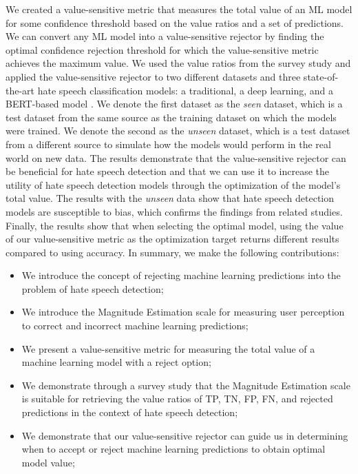 %
We created a value-sensitive metric that measures the total value of an ML model for some confidence threshold based on the value ratios and a set of predictions.
%
We can convert any ML model into a value-sensitive rejector by finding the optimal confidence rejection threshold for which the value-sensitive metric achieves the maximum value.
%
We used the value ratios from the survey study and applied the value-sensitive rejector to two different datasets and three state-of-the-art hate speech classification models: a traditional, a deep learning, and a BERT-based model \citep{devlin2018bert}.
%
We denote the first dataset as the \emph{seen} dataset, which is a test dataset from the same source as the training dataset on which the models were trained.
%
We denote the second as the \emph{unseen} dataset, which is a test dataset from a different source to simulate how the models would perform in the real world on new data.
%
The results demonstrate that the value-sensitive rejector can be beneficial for hate speech detection and that we can use it to increase the utility of hate speech detection models through the optimization of the model's total value.
%
The results with the \emph{unseen} data show that hate speech detection models are susceptible to bias, which confirms the findings from related studies.
%
Finally, the results show that when selecting the optimal model, using the value of our value-sensitive metric as the optimization target returns different results compared to using accuracy.
%
In summary, we make the following contributions:
%
\begin{itemize}
	\item We introduce the concept of rejecting machine learning predictions into the problem of hate speech detection;
	\item We introduce the Magnitude Estimation scale for measuring user perception to correct and incorrect machine learning predictions;
	\item We present a value-sensitive metric for measuring the total value of a machine learning model with a reject option;
	\item We demonstrate through a survey study that the Magnitude Estimation scale is suitable for retrieving the value ratios of TP, TN, FP, FN, and rejected predictions in the context of hate speech detection;
	\item We demonstrate that our value-sensitive rejector can guide us in determining when to accept or reject machine learning predictions to obtain optimal model value;
\end{itemize}
